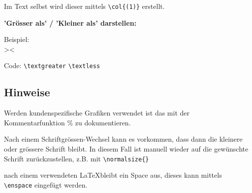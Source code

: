 Im Text selbst wird dieser mittels \verb+\col{(1)}+ erstellt.

\vspace{\baselineskip}

\textbf{'Grösser als' / 'Kleiner als' darstellen:}

Beispiel:\\
\textgreater \textless

Code: \verb+\textgreater+ \quad \verb+\textless+






\subsection{Hinweise} 

\begin{compactitem}
	\item Werden kundenspezifische Grafiken verwendet ist das mit der Kommentarfunktion \% zu dokumentieren.
	\item Nach einem Schriftgrössen-Wechsel kann es vorkommen, dass dann die kleinere oder grössere Schrift bleibt. In diesem Fall ist manuell wieder auf die gewünschte Schrift zurückzustellen, z.B. mit \verb+\normalsize{}+
	\item nach einem verwendeten \LaTeX \enspace bleibt ein Space aus, dieses kann mittels \verb+\enspace+ eingefügt werden.

\end{compactitem}

